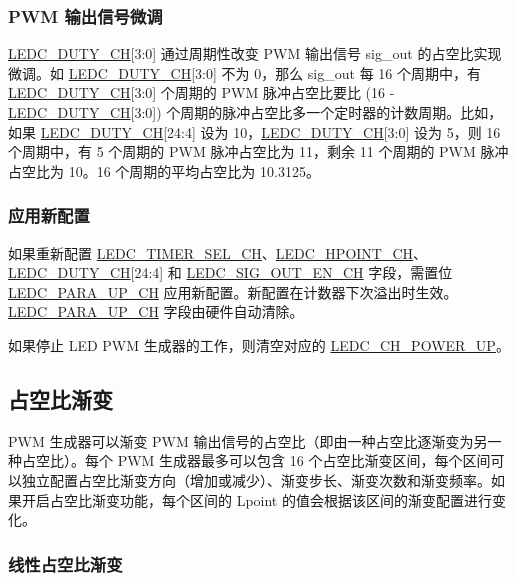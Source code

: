 \documentclass[main\_\_CN.tex]{subfiles}
\begin{document}
\subsubsection{PWM 输出信号微调}
\hyperref[fielddesc:LEDCDUTYCHN]{LEDC\_DUTY\_CH}[3:0] 通过周期性改变 PWM 输出信号 sig\_out 的占空比实现微调。如 \hyperref[fielddesc:LEDCDUTYCHN]{LEDC\_DUTY\_CH}[3:0] 不为 0，那么 sig\_out 每 16 个周期中，有 \hyperref[fielddesc:LEDCDUTYCHN]{LEDC\_DUTY\_CH}[3:0] 个周期的 PWM 脉冲占空比要比 (16 - \hyperref[fielddesc:LEDCDUTYCHN]{LEDC\_DUTY\_CH}[3:0]) 个周期的脉冲占空比多一个定时器的计数周期。比如，如果 \hyperref[fielddesc:LEDCDUTYCHN]{LEDC\_DUTY\_CH}[24:4] 设为 10，\hyperref[fielddesc:LEDCDUTYCHN]{LEDC\_DUTY\_CH}[3:0] 设为 5，则 16 个周期中，有 5 个周期的 PWM 脉冲占空比为 11，剩余 11 个周期的 PWM 脉冲占空比为 10。16 个周期的平均占空比为 10.3125。

\subsubsection{应用新配置}
如果重新配置 \hyperref[fielddesc:LEDCTIMERSELCHN]{LEDC\_TIMER\_SEL\_CH}、\hyperref[fielddesc:LEDCHPOINTCHN]{LEDC\_HPOINT\_CH}、\hyperref[fielddesc:LEDCDUTYCHN]{LEDC\_DUTY\_CH}[24:4] 和 \hyperref[fielddesc:LEDCSIGOUTENCHN]{LEDC\_SIG\_OUT\_EN\_CH} 字段，需置位 \hyperref[fielddesc:LEDCPARAUPCHN]{LEDC\_PARA\_UP\_CH} 应用新配置。新配置在计数器下次溢出时生效。\hyperref[fielddesc:LEDCPARAUPCHN]{LEDC\_PARA\_UP\_CH} 字段由硬件自动清除。

如果停止 LED PWM 生成器的工作，则清空对应的 \hyperref[fielddesc:LEDCCHNPOWERUP]{LEDC\_CH\_POWER\_UP}。

\subsection{占空比渐变}

PWM 生成器可以渐变 PWM 输出信号的占空比（即由一种占空比逐渐变为另一种占空比）。每个 PWM 生成器最多可以包含 16 个占空比渐变区间，每个区间可以独立配置占空比渐变方向（增加或减少）、渐变步长、渐变次数和渐变频率。如果开启占空比渐变功能，每个区间的 Lpoint 的值会根据该区间的渐变配置进行变化。

\subsubsection{线性占空比渐变}
\label{sec:ledc-pwm-linear-duty-cycle-fading}
\end{document}
